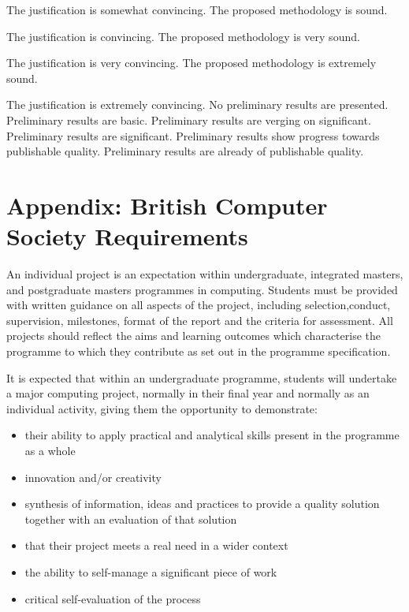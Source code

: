 \documentclass{../fal_assignment}
\begin{document}
\begin{markingrubric}
        \par		The justification is somewhat convincing.
        \grade 		The proposed methodology is sound.
        \par		The justification is convincing.
        \grade 		The proposed methodology is very sound.
        \par		The justification is very convincing.
        \grade 		The proposed methodology is extremely sound.
        \par		The justification is extremely convincing.
        \grade\fail No preliminary results are presented.
        \grade 		Preliminary results are basic.
        \grade 		Preliminary results are verging on significant.
        \grade 		Preliminary results are significant.
        \grade 		Preliminary results show progress towards publishable quality.
        \grade 		Preliminary results are already of publishable quality.
\end{markingrubric}

\section*{Appendix: British Computer Society Requirements}

An individual project is an expectation within undergraduate, integrated masters, and postgraduate masters programmes in computing. Students must be provided with written guidance on all aspects of the project, including selection,conduct, supervision, milestones, format of the report and the criteria for assessment. All projects should reflect the aims and learning outcomes which characterise the programme to which they contribute as set out in the programme specification.

It is expected that within an undergraduate programme, students will undertake a major computing project, normally in
their final year and normally as an individual activity, giving them the opportunity to demonstrate:

\begin{itemize}
\item their ability to apply practical and analytical skills present in the programme as a whole
\item innovation and/or creativity
\item synthesis of information, ideas and practices to provide a quality solution together with an evaluation of that solution
\item that their project meets a real need in a wider context
\item the ability to self-manage a significant piece of work
\item critical self-evaluation of the process
\end{itemize}
\end{document}
